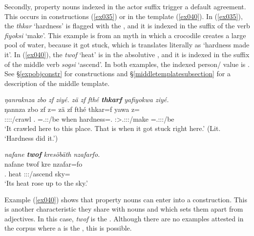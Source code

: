 Secondly, property nouns indexed in the actor suffix trigger a default   agreement. This occurs in  constructions (\ref{ex035}) or in the  template (\ref{ex040}). In (\ref{ex035}), the  \emph{thkar} `hardness' is flagged with the  , and it is indexed in the suffix of the verb \emph{fiyoksi} `make'. This example is from an myth in which a crocodile creates a large pool of water, because it got stuck, which is translates literally as `hardness made it'. In (\ref{ex040}), the  \emph{twof} `heat' is in the absolutive , and it is indexed in the suffix of the middle verb \emph{sogsi} `ascend'. In both examples, the indexed person/ value is \Stsg. See \S{}\ref{expobjconstr} for  constructions and \S{}\ref{middletemplatesubsection} for a description of the middle template.

\begin{exe}
	\ex \emph{ŋanraknza zbo zf ziyé. zä zf fthé \textbf{thkarf} yafiyokwa ziyé.}\\
	\gll ŋannza zbo zf z= zä zf fthé thkar=f yawa z=\\
	\Stsg:\Sbj:\Pst:\Ipfv:\Venit/crawl \Prox.\All{} \Imm{} \Prox=\Tsg.\Masc:\Sbj:\Nonpast/be \Prox{} \Imm{} when hardness=\Erg.\Sg{} \Stsg:\Sbj>\Tsg.\Masc:\Obj:\Pst:\Ipfv/make \Prox=\Tsg.\Masc:\Sbj:\Nonpast:\Ipfv/be\\
	\trans `It crawled here to this place. That is when it got stuck right here.' (Lit. `Hardness did it.') 
	\label{ex035}
\end{exe}
\begin{exe}
	\ex \emph{nafane \textbf{twof} kresöbäth nzafarfo.}\\
	\gll nafane twof kre nzafar=fo\\
	\Tsg{}.\Poss{} heat \Stsg{}:\Sbj:\Irr:\Pfv{}/ascend sky=\All{}\\
	\trans `Its heat rose up to the sky.' 
	\label{ex040}
\end{exe}

Example (\ref{ex040}) shows that property nouns can enter into a  construction. This is another characteristic they share with nouns and which sets them apart from adjectives. In this case, \emph{twof} is the . Although there are no examples attested in the corpus where a  is the , this is possible.%

